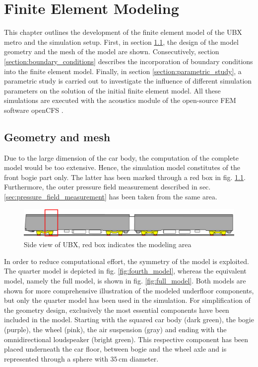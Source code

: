 \chapter{Finite Element Modeling}
\label{chap:FEM}

This chapter outlines the development of the finite element model of the UBX metro and the simulation setup. First, in section \ref{section:geometry}, the design of the model geometry and the mesh of the model are shown. Consecutively, section \ref{section:boundary_conditions} describes the incorporation of boundary conditions into the finite element model. Finally, in section \ref{section:parametric_study}, a parametric study is carried out to investigate the influence of different simulation parameters on the solution of the initial finite element model. All these simulations are executed with the acoustics module of the open-source FEM software openCFS \cite{opencfs}.


\section{Geometry and mesh}
\label{section:geometry}

Due to the large dimension of the car body, the computation of the complete model would be too extensive. Hence, the simulation model constitutes of the front bogie part only. The latter has been marked through a red box in fig. \ref{fig:red_box}. Furthermore, the outer pressure field measurement described in sec. \ref{sec:pressure_field_measurement} has been taken from the same area.


\begin{figure}[H]
	\centering
	\includegraphics[width=\textwidth]{fig/chap4/geometry/model_area.png}
	\caption{Side view of UBX, red box indicates the modeling area}
	\label{fig:red_box}
\end{figure}

In order to reduce computational effort, the symmetry of the model is exploited. The quarter model is depicted in fig. \ref{fig:fourth_model}, whereas the equivalent model, namely the full model, is shown in fig. \ref{fig:full_model}. Both models are shown for more comprehensive illustration of the modeled underfloor components, but only the quarter model has been used in the simulation. For simplification of the geometry design, exclusively the most essential components have been included in the model. Starting with the squared car body (dark green), the bogie (purple), the wheel (pink), the air suspension (gray) and ending with the omnidirectional loudspeaker (bright green). This respective component has been placed underneath the car floor, between bogie and the wheel axle and is represented through a sphere with $35\,\text{cm}$ diameter.


